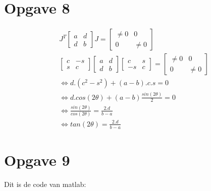 \documentclass[a4paper]{article}
\newcommand{\opgave}[1]{\section*{Opgave #1}}
\begin{document}
\opgave{8}
\begin{algorithmic}
\State
\begin{align*}
&J^{T}
\begin{bmatrix} 
a & d \\
d & b 
\end{bmatrix}
J
=
\begin{bmatrix} 
\neq 0 & 0 \\
0 & \neq 0
\end{bmatrix}\\
&\begin{bmatrix} 
c & -s \\
s & c
\end{bmatrix}
\begin{bmatrix} 
a & d \\
d & b 
\end{bmatrix}
\begin{bmatrix} 
c & s \\
-s & c 
\end{bmatrix}
=
\begin{bmatrix} 
\neq 0 & 0 \\
0 & \neq 0
\end{bmatrix}\\
&\Leftrightarrow d.(c^2-s^2)+(a-b).c.s = 0 \\
 &\Leftrightarrow d. cos(2\theta)+(a-b) \frac{sin(2\theta)}{2}= 0\\
 &\Leftrightarrow \frac{sin(2\theta)}{cos(2\theta)} = \frac{2.d}{b-a}\\
 &\Leftrightarrow tan(2\theta) = \frac{2.d}{b-a}
\end{align*}

\end{algorithmic}
\opgave{9}
Dit is de code van matlab:

\end{document}
